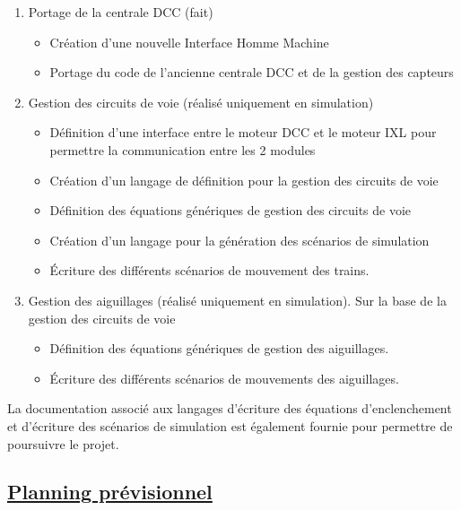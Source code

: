 \begin{enumerate}[1]
  \item Portage de la centrale DCC (fait)
  \begin{itemize}
    \item Création d'une nouvelle Interface
      Homme Machine
    \item Portage du code de l'ancienne centrale DCC et de la
      gestion des capteurs
  \end{itemize}

  \item Gestion des circuits de voie (réalisé uniquement en simulation)
  \begin{itemize}
    \item D\'efinition d'une interface entre le moteur DCC et le moteur IXL pour
      permettre la communication entre les 2 modules
    \item Cr\'eation d'un langage de d\'efinition pour la gestion des circuits
      de voie
    \item D\'efinition des \'equations g\'en\'eriques de gestion des circuits
      de voie
    \item Cr\'eation d'un langage pour la g\'en\'eration des sc\'enarios de
      simulation
    \item \'Ecriture des diff\'erents sc\'enarios de mouvement des trains.
  \end{itemize}

  
  \item Gestion des aiguillages (réalisé uniquement en simulation). Sur la
  base de la gestion des circuits de voie  
    \begin{itemize} 
      \item D\'efinition des \'equations g\'en\'eriques de gestion des aiguillages.
    \item \'Ecriture des diff\'erents sc\'enarios de mouvements des aiguillages.
    \end{itemize}
\end{enumerate}

La documentation associ\'e aux langages d'\'ecriture des \'equations
d'enclenchement et d'\'ecriture des sc\'enarios de simulation est
\'egalement fournie pour permettre de poursuivre le projet.


\newpage

\subsection{\underline{Planning pr\'evisionnel}}
\label{sec:planning}

